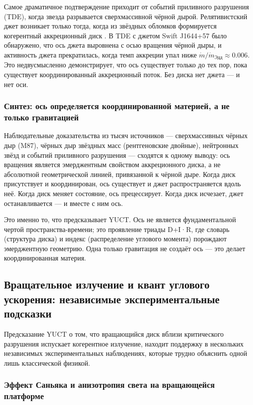 \documentclass[12pt,a4paper]{article}
\begin{document}
	Самое драматичное подтверждение приходит от событий приливного разрушения (TDE), когда звезда разрывается сверхмассивной чёрной дырой. Релятивистский джет возникает только тогда, когда из звёздных обломков формируется когерентный аккреционный диск \cite{TDE2016,TDE2020}. В TDE с джетом Swift J1644+57 было обнаружено, что ось джета выровнена с осью вращения чёрной дыры, и активность джета прекратилась, когда темп аккреции упал ниже \(\dot{m}/\dot{m}_{\text{Эдд}} \approx 0.006\). Это недвусмысленно демонстрирует, что ось существует только до тех пор, пока существует координированный аккреционный поток. Без диска нет джета — и нет оси.
	
	\subsubsection{Синтез: ось определяется координированной материей, а не только гравитацией}
	
	Наблюдательные доказательства из тысяч источников — сверхмассивных чёрных дыр (M87), чёрных дыр звёздных масс (рентгеновские двойные), нейтронных звёзд и событий приливного разрушения — сходятся к одному выводу: ось вращения является эмерджентным свойством аккреционного диска, а не абсолютной геометрической линией, привязанной к чёрной дыре. Когда диск присутствует и координирован, ось существует и джет распространяется вдоль неё. Когда диск меняет состояние, ось прецессирует. Когда диск исчезает, джет останавливается — и вместе с ним ось.
	
	Это именно то, что предсказывает YUCT. Ось не является фундаментальной чертой пространства-времени; это проявление триады D+I·R, где словарь (структура диска) и индекс (распределение углового момента) порождают эмерджентную геометрию. Одна только гравитация не создаёт ось — это делает координированная материя.
	
	\subsection{Вращательное излучение и квант углового ускорения: независимые экспериментальные подсказки}
	
	Предсказание YUCT о том, что вращающийся диск вблизи критического разрушения испускает когерентное излучение, находит поддержку в нескольких независимых экспериментальных наблюдениях, которые трудно объяснить одной лишь классической физикой.
	
	\subsubsection{Эффект Саньяка и анизотропия света на вращающейся платформе}
	
\end{document}
